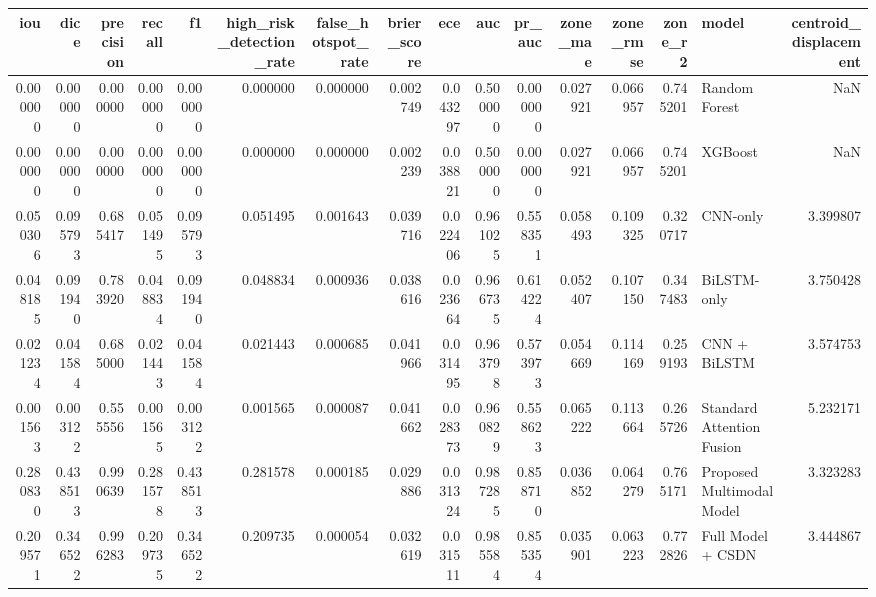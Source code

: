 \begin{tabular}{rrrrrrrrrrrrrrlr}
\toprule
iou & dice & precision & recall & f1 & high_risk_detection_rate & false_hotspot_rate & brier_score & ece & auc & pr_auc & zone_mae & zone_rmse & zone_r2 & model & centroid_displacement \\
\midrule
0.000000 & 0.000000 & 0.000000 & 0.000000 & 0.000000 & 0.000000 & 0.000000 & 0.002749 & 0.043297 & 0.500000 & 0.000000 & 0.027921 & 0.066957 & 0.745201 & Random Forest & NaN \\
0.000000 & 0.000000 & 0.000000 & 0.000000 & 0.000000 & 0.000000 & 0.000000 & 0.002239 & 0.038821 & 0.500000 & 0.000000 & 0.027921 & 0.066957 & 0.745201 & XGBoost & NaN \\
0.050306 & 0.095793 & 0.685417 & 0.051495 & 0.095793 & 0.051495 & 0.001643 & 0.039716 & 0.022406 & 0.961025 & 0.558351 & 0.058493 & 0.109325 & 0.320717 & CNN-only & 3.399807 \\
0.048185 & 0.091940 & 0.783920 & 0.048834 & 0.091940 & 0.048834 & 0.000936 & 0.038616 & 0.023664 & 0.966735 & 0.614224 & 0.052407 & 0.107150 & 0.347483 & BiLSTM-only & 3.750428 \\
0.021234 & 0.041584 & 0.685000 & 0.021443 & 0.041584 & 0.021443 & 0.000685 & 0.041966 & 0.031495 & 0.963798 & 0.573973 & 0.054669 & 0.114169 & 0.259193 & CNN + BiLSTM & 3.574753 \\
0.001563 & 0.003122 & 0.555556 & 0.001565 & 0.003122 & 0.001565 & 0.000087 & 0.041662 & 0.028373 & 0.960829 & 0.558623 & 0.065222 & 0.113664 & 0.265726 & Standard Attention Fusion & 5.232171 \\
0.280830 & 0.438513 & 0.990639 & 0.281578 & 0.438513 & 0.281578 & 0.000185 & 0.029886 & 0.031324 & 0.987285 & 0.858710 & 0.036852 & 0.064279 & 0.765171 & Proposed Multimodal Model & 3.323283 \\
0.209571 & 0.346522 & 0.996283 & 0.209735 & 0.346522 & 0.209735 & 0.000054 & 0.032619 & 0.031511 & 0.985584 & 0.855354 & 0.035901 & 0.063223 & 0.772826 & Full Model + CSDN & 3.444867 \\
\bottomrule
\end{tabular}
